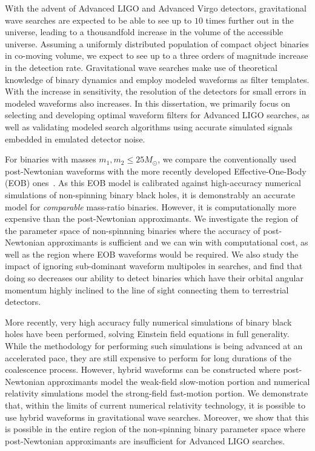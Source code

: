 
With the advent of Advanced LIGO and Advanced Virgo detectors, 
gravitational wave searches are expected to be able to see up to $10$
times further out in the universe, leading to a thousandfold increase in 
the volume of the accessible universe. Assuming a uniformly 
distributed population of compact object binaries in co-moving volume, 
we expect to see up to a three orders of magnitude increase in the detection 
rate. Gravitational wave searches make use of theoretical knowledge of
binary dynamics and employ modeled waveforms as filter templates.
With the increase in sensitivity, the resolution of the detectors 
for small errors in modeled waveforms also increases. In this dissertation,
we primarily focus on selecting and developing optimal waveform filters
for Advanced LIGO searches, as well as validating modeled search algorithms
using accurate simulated signals embedded in emulated detector noise.

For binaries with masses $m_1,m_2\leq 25M_\odot$, we compare the 
conventionally used post-Newtonian waveforms with the more recently 
developed Effective-One-Body (EOB) ones~\cite{BuonannoEOBv2Main}. 
As this EOB model is calibrated
against high-accuracy numerical simulations of non-spinning binary 
black holes, it is demonstrably an accurate model for {\it comparable}
mass-ratio binaries. However, it is computationally more expensive
than the post-Newtonian approximants. 
We investigate the region of the parameter
space of non-spinnning binaries where the accuracy of post-Newtonian
approximants is sufficient and we can win with computational cost, as
well as the region where EOB waveforms would be required. We also
study the impact of ignoring sub-dominant waveform multipoles in 
searches, and find that doing so decreases our ability to detect binaries
which have their orbital angular momentum highly inclined to the 
line of sight connecting them to terrestrial detectors.

More recently, very high accuracy fully numerical simulations of 
binary black holes have been performed, solving Einstein field equations
in full generality. While the methodology for performing such simulations
is being advanced at an accelerated pace, they are still expensive to 
perform for long durations of the coalescence process. However, hybrid
waveforms can be constructed where post-Newtonian approximants model the 
weak-field slow-motion portion and numerical relativity simulations 
model the strong-field fast-motion portion. We demonstrate that, within the 
limits of current numerical relativity technology, 
it is possible to use hybrid waveforms
in gravitational wave searches. Moreover, we show that this is possible in 
the entire region of the non-spinning binary parameter space where
post-Newtonian approximants are insufficient for Advanced LIGO searches.

